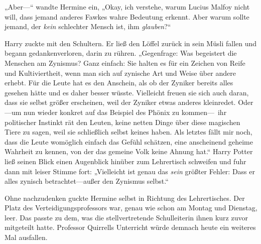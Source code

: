 „Aber—“ wandte Hermine ein, „Okay, ich verstehe, warum Lucius Malfoy nicht will, dass jemand anderes Fawkes wahre Bedeutung erkennt. Aber warum sollte jemand, der \emph{kein} schlechter Mensch ist, ihm \emph{glauben}?“

Harry zuckte mit den Schultern. Er ließ den Löffel zurück in sein Müsli fallen und begann gedankenverloren, darin zu rühren. „Gegenfrage: Was begeistert die Menschen am Zynismus? Ganz einfach: Sie halten es für ein Zeichen von Reife und Kultiviertheit, wenn man sich auf zynische Art und Weise über andere erhebt. Für die Leute hat es den Anschein, als ob der Zyniker bereits alles gesehen hätte und es daher besser wüsste. Vielleicht freuen sie sich auch daran, dass sie selbst größer erscheinen, weil der Zyniker etwas anderes kleinredet. Oder—um nun wieder konkret auf das Beispiel des Phönix zu kommen—~ihr politischer Instinkt rät den Leuten, keine netten Dinge über diese magischen Tiere zu sagen, weil sie schließlich selbst keines haben. Als letztes fällt mir noch, dass die Leute womöglich einfach das Gefühl schätzen, eine anscheinend geheime Wahrheit zu kennen, von der das gemeine Volk keine Ahnung hat.“
Harry Potter ließ seinen Blick einen Augenblick hinüber zum Lehrertisch schweifen und fuhr dann mit leiser Stimme fort: „Vielleicht ist genau das \emph{sein} größter Fehler: Dass er alles zynisch betrachtet—außer den Zynismus selbst.“

Ohne nachzudenken guckte Hermine selbst in Richtung des Lehrertisches. Der Platz des Verteidigungsprofessors war, genau wie schon am Montag und Dienstag, leer. Das passte zu dem, was die stellvertretende Schulleiterin ihnen kurz zuvor mitgeteilt hatte. Professor Quirrells Unterricht würde demnach heute ein weiteres Mal ausfallen.

